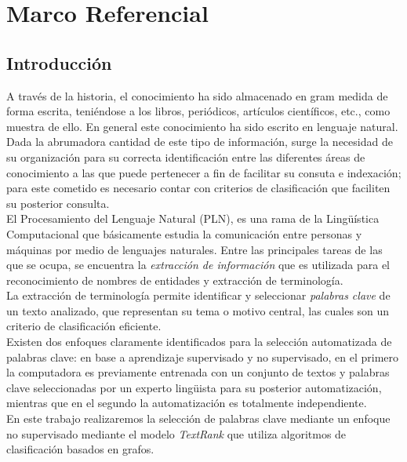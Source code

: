 \chapter{Marco Referencial}
\section{Introducci\'on}
A trav\'es de la historia, el conocimiento ha sido almacenado en gram medida de forma
escrita, teni\'endose a los libros, peri\'odicos, art\'iculos cient\'ificos, etc.,
como muestra de ello. En general este conocimiento ha sido escrito en lenguaje
natural.\\

Dada la abrumadora cantidad de este tipo de informaci\'on, surge la necesidad de su
organizaci\'on para su correcta identificaci\'on entre las diferentes \'areas de
conocimiento a las que puede pertenecer a fin de facilitar su consuta e indexaci\'on;
para este cometido es necesario contar con criterios de clasificaci\'on que faciliten
su posterior consulta.\\

El Procesamiento del Lenguaje Natural (PLN), es una rama de la Ling\"u\'istica
Computacional que b\'asicamente estudia la comunicaci\'on entre personas y m\'aquinas
por medio de lenguajes naturales. Entre las principales tareas de las que se ocupa,
se encuentra la \emph{extracci\'on de informaci\'on} que es utilizada para el
reconocimiento de nombres de entidades y extracci\'on de terminolog\'ia. \\

La extracci\'on de terminolog\'ia permite identificar y seleccionar \emph{palabras
clave} de un texto analizado, que representan su tema o motivo central, las cuales
son un criterio de clasificaci\'on eficiente. \\

Existen dos enfoques claramente identificados para la selecci\'on automatizada de
palabras clave: en base a aprendizaje supervisado y no supervisado, en el primero
la computadora es previamente entrenada con un conjunto de textos y palabras clave
seleccionadas por un experto ling\"uista para su posterior automatizaci\'on, mientras
que en el segundo la automatizaci\'on es totalmente independiente. \\

En este trabajo realizaremos la selecci\'on de palabras clave mediante un enfoque
no supervisado mediante el modelo \emph{TextRank} que utiliza algoritmos de
clasificaci\'on basados en grafos.


